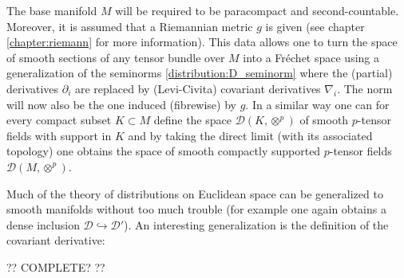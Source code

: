     The base manifold $M$ will be required to be paracompact and second-countable. Moreover, it is assumed that a Riemannian metric $g$ is given (see chapter \ref{chapter:riemann} for more information). This data allows one to turn the space of smooth sections of any tensor bundle over $M$ into a Fr\'echet space using a generalization of the seminorms \ref{distribution:D_seminorm} where the (partial) derivatives $\partial_i$ are replaced by (Levi-Civita) covariant derivatives $\nabla_i$. The norm will now also be the one induced (fibrewise) by $g$. In a similar way one can for every compact subset $K\subset M$ define the space $\mathcal{D}(K, \otimes^p)$ of smooth $p$-tensor fields with support in $K$ and by taking the direct limit (with its associated topology) one obtains the space of smooth compactly supported $p$-tensor fields $\mathcal{D}(M, \otimes^p)$.


    Much of the theory of distributions on Euclidean space can be generalized to smooth manifolds without too much trouble (for example one again obtains a dense inclusion $\mathcal{D}\hookrightarrow\mathcal{D}'$). An interesting generalization is the definition of the covariant derivative:

    ?? COMPLETE? ??